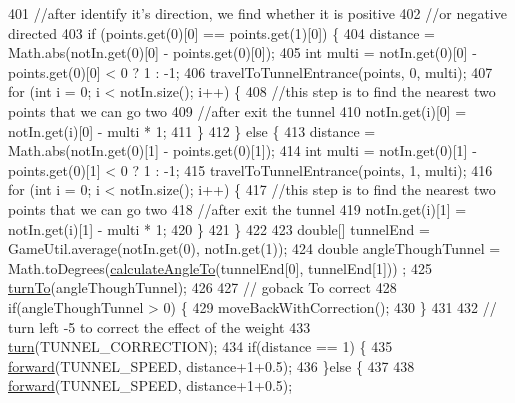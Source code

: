 \begin{DoxyCode}
401     \textcolor{comment}{//after identify it's direction, we find whether it is positive }
402     \textcolor{comment}{//or negative directed}
403     \textcolor{keywordflow}{if} (points.get(0)[0] == points.get(1)[0]) \{
404       distance = Math.abs(notIn.get(0)[0] - points.get(0)[0]);
405       \textcolor{keywordtype}{int} multi = notIn.get(0)[0] - points.get(0)[0] < 0 ? 1 : -1;
406       travelToTunnelEntrance(points, 0, multi);
407       \textcolor{keywordflow}{for} (\textcolor{keywordtype}{int} i = 0; i < notIn.size(); i++) \{
408         \textcolor{comment}{//this step is to find the nearest two points that we can go two}
409         \textcolor{comment}{//after exit the tunnel}
410         notIn.get(i)[0] = notIn.get(i)[0] - multi * 1;
411       \}
412     \} \textcolor{keywordflow}{else} \{
413       distance = Math.abs(notIn.get(0)[1] - points.get(0)[1]);
414       \textcolor{keywordtype}{int} multi = notIn.get(0)[1] - points.get(0)[1] < 0 ? 1 : -1;
415       travelToTunnelEntrance(points, 1, multi);
416       \textcolor{keywordflow}{for} (\textcolor{keywordtype}{int} i = 0; i < notIn.size(); i++) \{
417       \textcolor{comment}{//this step is to find the nearest two points that we can go two}
418       \textcolor{comment}{//after exit the tunnel}
419         notIn.get(i)[1] = notIn.get(i)[1] - multi * 1;
420       \}
421     \}
422     
423     \textcolor{keywordtype}{double}[] tunnelEnd = GameUtil.average(notIn.get(0), notIn.get(1));
424     \textcolor{keywordtype}{double} angleThoughTunnel = Math.toDegrees(\hyperlink{classca_1_1mcgill_1_1ecse211_1_1project_1_1_navigation_a4376e54162df8f123ca3b52e4fd2f38d}{calculateAngleTo}(tunnelEnd[0], tunnelEnd[1]))
      ;
425     \hyperlink{classca_1_1mcgill_1_1ecse211_1_1project_1_1_navigation_a3bbe0645f2b3b3d0986b4a707fb5a00c}{turnTo}(angleThoughTunnel);
426     
427     \textcolor{comment}{// goback To correct}
428     \textcolor{keywordflow}{if}(angleThoughTunnel > 0) \{
429       moveBackWithCorrection();
430     \}
431 
432     \textcolor{comment}{// turn left -5 to correct the effect of the weight}
433     \hyperlink{classca_1_1mcgill_1_1ecse211_1_1project_1_1_navigation_ad74286ad36d333bfaf57661837457b76}{turn}(TUNNEL\_CORRECTION);
434       \textcolor{keywordflow}{if}(distance == 1) \{  
435         \hyperlink{classca_1_1mcgill_1_1ecse211_1_1project_1_1_navigation_a7c66610c5b7496ddb35d342ab2cd3f08}{forward}(TUNNEL\_SPEED, distance+1+0.5);
436       \}\textcolor{keywordflow}{else} \{
437         
438         \hyperlink{classca_1_1mcgill_1_1ecse211_1_1project_1_1_navigation_a7c66610c5b7496ddb35d342ab2cd3f08}{forward}(TUNNEL\_SPEED, distance+1+0.5);

\end{DoxyCode}
